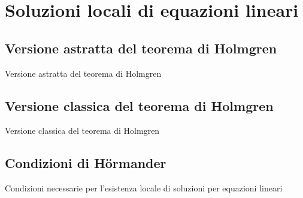 \chapter{Soluzioni locali di equazioni lineari}

\section{Versione astratta del teorema di Holmgren}
Versione astratta del teorema di Holmgren
\section{Versione classica del teorema di Holmgren}
Versione classica del teorema di Holmgren
\section{Condizioni di Hörmander}
Condizioni necessarie per l'esistenza locale di soluzioni per equazioni lineari
